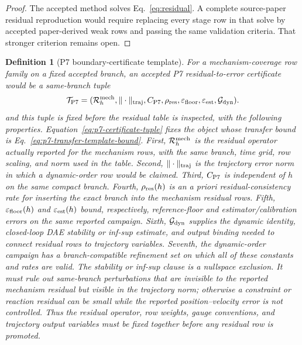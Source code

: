 \documentclass[preprint,12pt]{elsarticle}
\newtheorem{definition}{Definition}
\begin{document}
\begin{proof}
The accepted method solves Eq.~\eqref{eq:residual}. A complete source-paper
residual reproduction would require replacing every stage row in that solve by
accepted paper-derived weak rows and passing the same validation criteria.
That stronger criterion remains open.
\end{proof}

\begin{definition}[P7 boundary-certificate template]
\label{def:p7-transfer-certificate-template}
For a mechanism-coverage row family on a fixed accepted branch, an accepted
P7 residual-to-error certificate would be a same-branch tuple
\begin{equation}
\label{eq:p7-certificate-tuple}
  \mathcal T_{\rm P7}
  =(\mathcal R_h^{\rm mech},\|\cdot\|_{\rm traj},C_{\rm P7},
    \rho_{\rm res},\varepsilon_{\rm floor},\varepsilon_{\rm est},
    \mathcal G_{\rm dyn}).
\end{equation}
and this tuple is fixed before the residual table is inspected, with the following properties.
Equation~\eqref{eq:p7-certificate-tuple} fixes the object whose transfer
bound is Eq.~\eqref{eq:p7-transfer-template-bound}.
First, \(\mathcal R_h^{\rm mech}\) is the residual operator actually reported
for the mechanism rows, with the same branch, time grid, row scaling, and
norm used in the table. Second, \(\|\cdot\|_{\rm traj}\) is the trajectory
error norm in which a dynamic-order row would be claimed. Third,
\(C_{\rm P7}\) is independent of \(h\) on the same compact branch. Fourth,
\(\rho_{\rm res}(h)\) is an a priori residual-consistency rate for inserting
the exact branch into the mechanism residual rows. Fifth,
\(\varepsilon_{\rm floor}(h)\) and \(\varepsilon_{\rm est}(h)\) bound,
respectively, reference-floor and estimator/calibration errors on the same
reported campaign. Sixth, \(\mathcal G_{\rm dyn}\) supplies the dynamic
identity, closed-loop DAE stability or inf-sup estimate, and output binding
needed to connect residual rows to trajectory variables. Seventh, the
dynamic-order campaign has a branch-compatible refinement set on which all
of these constants and rates are valid.
The stability or inf-sup clause is a nullspace exclusion.  It must rule out
same-branch perturbations that are invisible to the reported mechanism
residual but visible in the trajectory norm; otherwise a constraint or
reaction residual can be small while the reported position--velocity error is
not controlled.  Thus the residual operator, row weights, gauge conventions,
and trajectory output variables must be fixed together before any residual row
is promoted.


\end{definition}
\end{document}
